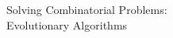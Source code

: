 % 
% 
% 
% 
\begin{frame}[c]{}

\centering
\huge
Solving Combinatorial Problems:\\
Evolutionary Algorithms

\end{frame}
